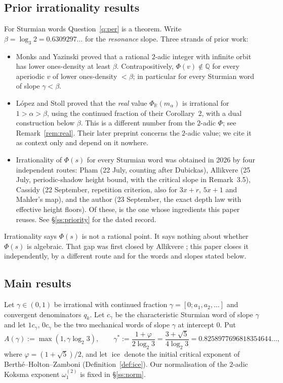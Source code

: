 \documentclass[11pt,reqno]{amsart}
\theoremstyle{plain}
\theoremstyle{definition}
\DeclareMathOperator{\ice}{ice}
\newcommand{\Q}{\mathbb{Q}}
\newcommand{\R}{\mathbb{R}}
\newcommand{\PH}{\Phi}
\newcommand{\gs}{\gamma^{*}}
\newcommand{\Av}{A(\gamma)}
\newcommand{\om}{\omega_1^{(2)}}
\begin{document}
\subsection{Prior irrationality results}
For Sturmian words Question~\ref{q:per} is a theorem. Write $\beta=\log_3 2=0.6309297\ldots$ for the
\emph{resonance} slope. Three strands of prior work:

\begin{itemize}
\item Monks and Yazinski \cite[Theorem 2.7(b)]{MY04} proved that a rational $2$-adic integer with
  infinite orbit has lower ones-density at least $\beta$. Contrapositively, $\PH(v)\notin\Q$ for
  every aperiodic $v$ of lower ones-density $<\beta$; in particular for every Sturmian word of slope
  $\gamma<\beta$.
\item L\'opez and Stoll \cite[\S4]{LS09} proved that the \emph{real} value
  $\PH_{\R}(m_\alpha)$ is irrational for $1>\alpha>\beta$, using the continued fraction of their
  Corollary~2, with a dual construction below $\beta$. This is a different number from the $2$-adic
  $\PH$; see Remark~\ref{rem:real}. Their later preprint \cite[Theorem 1]{LS21} concerns the
  $2$-adic value; we cite it as context only and depend on it nowhere.
\item Irrationality of $\PH(s)$ for every Sturmian word was obtained in 2026 by four independent
  routes: Pham \cite{Pham26} (22 July, counting after Dubickas), Allikvere
  \cite[Corollary 3.4]{Allikvere26} (25 July, periodic-shadow height bound, with the critical
  slope in Remark~3.5), Cassidy \cite[Theorems R and S]{Cassidy26} (22 September, repetition
  criterion, also for $3x+r$, $5x+1$ and Mahler's map), and the author
  \cite[Theorems 8.5 and 10.1, Corollary 10.5]{DJirr} (23 September, the exact depth law with
  effective height floors). Of these, \cite{DJirr} is the one whose ingredients this paper
  reuses. See \S\ref{ss:priority} for the dated record.
\end{itemize}

Irrationality says $\PH(s)$ is not a rational point. It says nothing about whether $\PH(s)$ is
algebraic. That gap was first closed by Allikvere \cite{Allikvere26}; this paper closes it
independently, by a different route and for the words and slopes stated below.

\subsection{Main results}
Let $\gamma\in(0,1)$ be irrational with continued fraction $\gamma=[0;a_1,a_2,\dots]$ and
convergent denominators $q_k$. Let $c_\gamma$ be the characteristic Sturmian word of slope $\gamma$
and let $1c_\gamma$, $0c_\gamma$ be the two mechanical words of slope $\gamma$ at intercept $0$.
Put
\[
  \Av:=\max(1,\gamma\log_2 3),\qquad
  \gs:=\frac{1+\varphi}{2\log_2 3}=\frac{3+\sqrt5}{4\log_2 3}=0.8258977696818354644\ldots,
\]
where $\varphi=(1+\sqrt5)/2$, and let $\ice$ denote the initial critical exponent of
Berth\'e--Holton--Zamboni \cite[\S2]{BHZ06} (Definition~\ref{def:ice}). Our normalisation of the
$2$-adic Koksma exponent $\om$ is fixed in \S\ref{ss:norm}.
\end{document}
